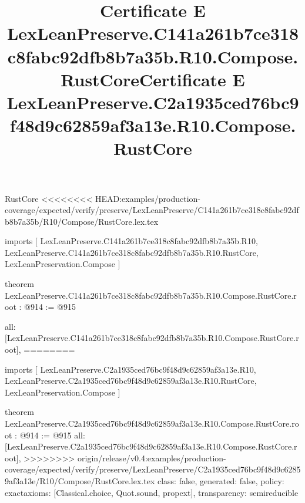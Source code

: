 \begin{lexlean}{RustCore}
<<<<<<<< HEAD:examples/production-coverage/expected/verify/preserve/LexLeanPreserve/C141a261b7ce318c8fabc92dfb8b7a35b/R10/Compose/RustCore.lex.tex
\title{Certificate E LexLeanPreserve.C141a261b7ce318c8fabc92dfb8b7a35b.R10.Compose.RustCore}
\begin{coremodule}
imports [
  LexLeanPreserve.C141a261b7ce318c8fabc92dfb8b7a35b.R10,
  LexLeanPreserve.C141a261b7ce318c8fabc92dfb8b7a35b.R10.RustCore,
  LexLeanPreservation.Compose
]

theorem LexLeanPreserve.C141a261b7ce318c8fabc92dfb8b7a35b.R10.Compose.RustCore.root : @914 := @915 {
  all: [LexLeanPreserve.C141a261b7ce318c8fabc92dfb8b7a35b.R10.Compose.RustCore.root],
========
\title{Certificate E LexLeanPreserve.C2a1935ced76bc9f48d9c62859af3a13e.R10.Compose.RustCore}
\begin{coremodule}
imports [
  LexLeanPreserve.C2a1935ced76bc9f48d9c62859af3a13e.R10,
  LexLeanPreserve.C2a1935ced76bc9f48d9c62859af3a13e.R10.RustCore,
  LexLeanPreservation.Compose
]

theorem LexLeanPreserve.C2a1935ced76bc9f48d9c62859af3a13e.R10.Compose.RustCore.root : @914 := @915 {
  all: [LexLeanPreserve.C2a1935ced76bc9f48d9c62859af3a13e.R10.Compose.RustCore.root],
>>>>>>>> origin/release/v0.4:examples/production-coverage/expected/verify/preserve/LexLeanPreserve/C2a1935ced76bc9f48d9c62859af3a13e/R10/Compose/RustCore.lex.tex
  class: false,
  generated: false,
  policy: exact{axioms: [Classical.choice, Quot.sound, propext]},
  transparency: semireducible
}


\end{coremodule}}
\end{coremodule}
\end{lexlean}
